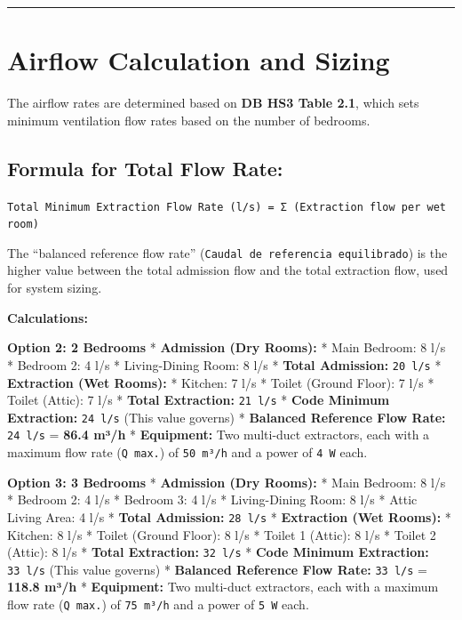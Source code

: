 \documentclass[
  10pt,
  letterpaper,
]{scrbook}
\begin{document}
\begin{center}\rule{0.5\linewidth}{0.5pt}\end{center}

\section{Airflow Calculation and
Sizing}\label{airflow-calculation-and-sizing}

The airflow rates are determined based on \textbf{DB HS3 Table 2.1},
which sets minimum ventilation flow rates based on the number of
bedrooms.

\subsection{Formula for Total Flow
Rate:}\label{formula-for-total-flow-rate}

\texttt{Total\ Minimum\ Extraction\ Flow\ Rate\ (l/s)\ =\ Σ\ (Extraction\ flow\ per\ wet\ room)}

The ``balanced reference flow rate''
(\texttt{Caudal\ de\ referencia\ equilibrado}) is the higher value
between the total admission flow and the total extraction flow, used for
system sizing.

\textbf{Calculations:}

\textbf{Option 2: 2 Bedrooms} * \textbf{Admission (Dry Rooms):} * Main
Bedroom: 8 l/s * Bedroom 2: 4 l/s * Living-Dining Room: 8 l/s *
\textbf{Total Admission:} \texttt{20\ l/s} * \textbf{Extraction (Wet
Rooms):} * Kitchen: 7 l/s * Toilet (Ground Floor): 7 l/s * Toilet
(Attic): 7 l/s * \textbf{Total Extraction:} \texttt{21\ l/s} *
\textbf{Code Minimum Extraction:} \texttt{24\ l/s} (This value governs)
* \textbf{Balanced Reference Flow Rate:} \texttt{24\ l/s} = \textbf{86.4
m³/h} * \textbf{Equipment:} Two multi-duct extractors, each with a
maximum flow rate (\texttt{Q\ max.}) of \texttt{50\ m³/h} and a power of
\texttt{4\ W} each.

\textbf{Option 3: 3 Bedrooms} * \textbf{Admission (Dry Rooms):} * Main
Bedroom: 8 l/s * Bedroom 2: 4 l/s * Bedroom 3: 4 l/s * Living-Dining
Room: 8 l/s * Attic Living Area: 4 l/s * \textbf{Total Admission:}
\texttt{28\ l/s} * \textbf{Extraction (Wet Rooms):} * Kitchen: 8 l/s *
Toilet (Ground Floor): 8 l/s * Toilet 1 (Attic): 8 l/s * Toilet 2
(Attic): 8 l/s * \textbf{Total Extraction:} \texttt{32\ l/s} *
\textbf{Code Minimum Extraction:} \texttt{33\ l/s} (This value governs)
* \textbf{Balanced Reference Flow Rate:} \texttt{33\ l/s} =
\textbf{118.8 m³/h} * \textbf{Equipment:} Two multi-duct extractors,
each with a maximum flow rate (\texttt{Q\ max.}) of \texttt{75\ m³/h}
and a power of \texttt{5\ W} each.
\end{document}
